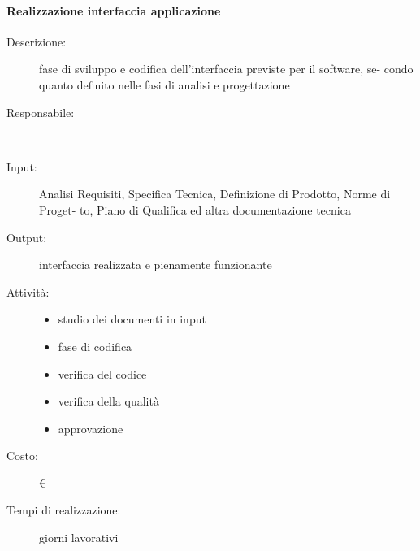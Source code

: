 \paragraph{Realizzazione interfaccia applicazione}
\begin{description}
\item[Descrizione:] fase di sviluppo e codifica dell'interfaccia previste per il software, se-
condo quanto definito nelle fasi di analisi e progettazione \\

\item[Responsabile:] \\

\item[Input:] Analisi Requisiti, Specifica Tecnica, Definizione di Prodotto, Norme di Proget-
to, Piano di Qualifica ed altra documentazione tecnica \\

\item[Output:] interfaccia realizzata e pienamente funzionante\\

\item[Attività:]
\begin{itemize}
\item studio dei documenti in input
\item fase di codifica
\item verifica del codice
\item verifica della qualità
\item approvazione
\end{itemize}
\item[Costo:] \euro \\
\item[Tempi di realizzazione:]  giorni lavorativi
\end{description}



